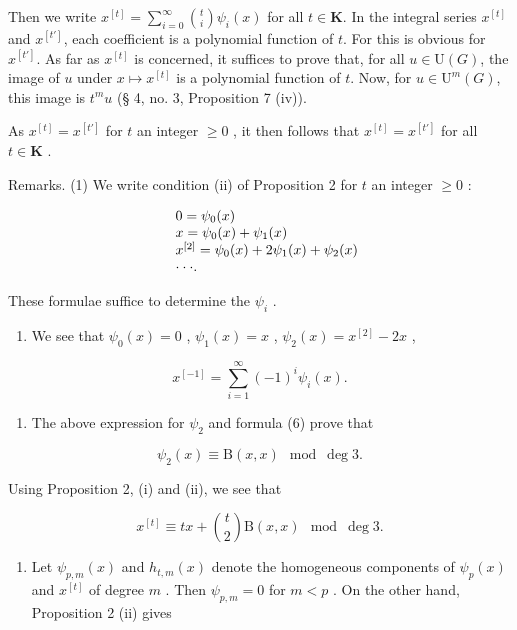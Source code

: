 Then we write \(x^{[t]} = \sum_{i=0}^{\infty} \binom{t}{i}\psi_i(x)\) for all \(t\in\mathbf{K}\). In the integral series \(x^{[t]}\) and \(x^{[t']}\), each coefficient is a polynomial function of \(t\). For this is obvious for \(x^{[t']}\). As far as \(x^{[t]}\) is concerned, it suffices to prove that, for all \(u\in\mathrm{U}(G)\), the image of \(u\) under \(x\mapsto x^{[t]}\) is a polynomial function of \(t\). Now, for \(u\in\mathrm{U}^{m}(G)\), this image is \(t^{m}u\) (§ 4, no. 3, Proposition 7 (iv)).

As \(x^{[t]} = x^{[t']}\) for \(t\) an integer \(\geqslant 0\) , it then follows that \(x^{[t]} = x^{[t']}\) for all \(t \in \mathbf{K}\) .

Remarks. (1) We write condition (ii) of Proposition 2 for \(t\) an integer \(\geqslant 0\) :

\[
\begin{array}{r l} & 0 = \psi_ {0} (x) \\ & x = \psi_ {0} (x) + \psi_ {1} (x) \\ & x ^ {[ 2 ]} = \psi_ {0} (x) + 2 \psi_ {1} (x) + \psi_ {2} (x) \\ & \cdot \cdot \cdot . \end{array}
\]

These formulae suffice to determine the \(\psi_{i}\) .

\begin{enumerate}
\def\labelenumi{(\arabic{enumi})}
\setcounter{enumi}{1}
\tightlist
\item
  We see that \(\psi_0(x) = 0\) , \(\psi_1(x) = x\) , \(\psi_2(x) = x^{[2]} - 2x\) ,
\end{enumerate}

\[
x ^ {[ - 1 ]} = \sum_ {i = 1} ^ {\infty} (- 1) ^ {i} \psi_ {i} (x).
\]

\begin{enumerate}
\def\labelenumi{(\arabic{enumi})}
\setcounter{enumi}{2}
\tightlist
\item
  The above expression for \(\psi_{2}\) and formula (6) prove that
\end{enumerate}

\[
\psi_ {2} (x) \equiv \mathrm{B} (x, x) \mod \deg 3.\tag{21}
\]

Using Proposition 2, (i) and (ii), we see that

\[
x ^ {[ t ]} \equiv t x + \binom {t} {2} \mathrm{B} (x, x) \mod \deg 3.\tag{22}
\]

\begin{enumerate}
\def\labelenumi{(\arabic{enumi})}
\setcounter{enumi}{3}
\tightlist
\item
  Let \(\psi_{p,m}(x)\) and \(h_{t,m}(x)\) denote the homogeneous components of \(\psi_p(x)\) and \(x^{[t]}\) of degree \(m\) . Then \(\psi_{p,m} = 0\) for \(m < p\) . On the other hand, Proposition 2 (ii) gives
\end{enumerate}

